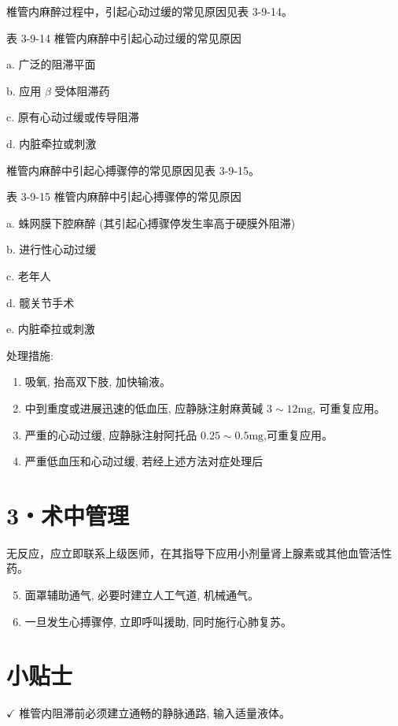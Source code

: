 \documentclass[10pt]{article}
\begin{document}
椎管内麻醉过程中，引起心动过缓的常见原因见表 3-9-14。

表 3-9-14 椎管内麻醉中引起心动过缓的常见原因

a. 广泛的阻滞平面

b. 应用 $\beta$ 受体阻滞药

c. 原有心动过缓或传导阻滞

d. 内脏牵拉或刺激

椎管内麻醉中引起心搏骤停的常见原因见表 3-9-15。

表 3-9-15 椎管内麻醉中引起心搏骤停的常见原因

a. 蛛网膜下腔麻醉 (其引起心搏骤停发生率高于硬膜外阻滞)

b. 进行性心动过缓

c. 老年人

d. 髋关节手术

e. 内脏牵拉或刺激

处理措施:

\begin{enumerate}
  \item 吸氧, 抬高双下肢, 加快输液。

  \item 中到重度或进展迅速的低血压, 应静脉注射麻黄碱 $3 \sim 12 \mathrm{mg}$, 可重复应用。

  \item 严重的心动过缓, 应静脉注射阿托品 $0.25 \sim 0.5 \mathrm{mg}$,可重复应用。

  \item 严重低血压和心动过缓, 若经上述方法对症处理后

\end{enumerate}

\section*{3・术中管理}
无反应，应立即联系上级医师，在其指导下应用小剂量肾上腺素或其他血管活性药。

\begin{enumerate}
  \setcounter{enumi}{4}
  \item 面罩辅助通气, 必要时建立人工气道, 机械通气。

  \item 一旦发生心搏骤停, 立即呼叫援助, 同时施行心肺复苏。

\end{enumerate}

\section*{小贴士}
$\checkmark$ 椎管内阻滞前必须建立通畅的静脉通路, 输入适量液体。
\end{document}
